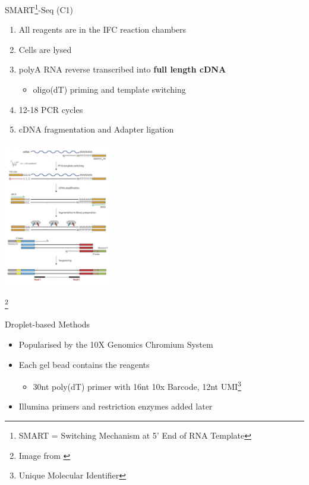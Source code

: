 \documentclass[aspectratio=169,11pt]{beamer}
\newcommand\blfootnote[1]{%
  \begingroup
  \renewcommand\thefootnote{}\footnote{#1}%
  \addtocounter{footnote}{-1}%
  \endgroup
}
\begin{document}
\begin{frame}{SMART\footnote{SMART = Switching Mechanism at 5' End of RNA Template}-Seq (C1)}

	\begin{enumerate}
		\item All reagents are in the IFC reaction chambers
		\item Cells are lysed
		\item polyA RNA reverse transcribed into \textbf{full length cDNA}
		\begin{itemize}
			\item oligo(dT) priming and template switching
		\end{itemize}
		\item 12-18 PCR cycles
		\item cDNA fragmentation and Adapter ligation
	\end{enumerate}


\end{frame}

\begin{frame}
	\begin{center}
	\includegraphics[width=0.35\textwidth]{figures/SMARTSeq.png} 
	\end{center}
	\blfootnote{Image from \cite{pmid27442339}}
\end{frame}

\begin{frame}{Droplet-based Methods}

	\begin{itemize}
		\item Popularised by the 10X Genomics Chromium System
		\item Each gel bead contains the reagents
		\begin{itemize}
			\item 30nt poly(dT) primer with 16nt 10x Barcode, 12nt UMI\footnote{Unique Molecular Identifier}
		\end{itemize}
		\item Illumina primers and restriction enzymes added later
	\end{itemize}

\end{frame}
\end{document}
